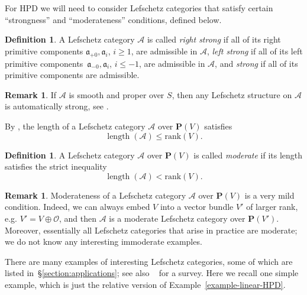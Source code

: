 \documentclass[11pt, reqno]{amsart}
\numberwithin{equation}{section}
\theoremstyle{plain}
\theoremstyle{definition}
\newtheorem{definition}[theorem]{Definition}
\newtheorem{remark}[theorem]{Remark}
\DeclareMathOperator{\length}{\mathrm{length}}
\newcommand{\rank}{\mathrm{rank}}
\newcommand{\cO}{\mathcal{O}}
\newcommand{\cA}{\mathcal{A}}
\newcommand{\fa}{\mathfrak{a}}
\newcommand{\bP}{\mathbf{P}}
\begin{document}
For HPD we will need to consider Lefschetz categories that satisfy 
certain ``strongness'' and ``moderateness'' conditions, defined below. 

\begin{definition}
\label{definition:strong}
A Lefschetz category $\cA$ is called \emph{right strong} if all of its right primitive components 
$\fa_{+0}, \fa_i$, $i \geq 1$, are admissible in $\cA$, 
\emph{left strong} if all of its left primitive components~$\fa_{-0}, \fa_{i}$, $i \leq -1$, are admissible in $\cA$, 
and \emph{strong} if all of its primitive components are admissible. 
\end{definition} 

\begin{remark}
\label{remark:smooth-strong}
If $\cA$ is smooth and proper over $S$, then any Lefschetz structure on $\cA$ is automatically strong, 
see \cite[Remark 6.7]{NCHPD}. 
\end{remark}

By \cite[Corollary 6.19(1)]{NCHPD}, the length of a Lefschetz category $\cA$ over $\bP(V)$ satisfies 
\begin{equation}
\label{length-leq-rank}
\length(\cA) \leq \rank(V). 
\end{equation}

\begin{definition}
\label{def:moderateness}
A Lefschetz category $\cA$ over $\bP(V)$ is called \emph{moderate} if its length satisfies the strict inequality
\begin{equation*}
\length(\cA) < \rank(V) . 
\end{equation*} 
\end{definition}

\begin{remark}
\label{remark-moderate} 
Moderateness of a Lefschetz category $\cA$ over $\bP(V)$ is a very mild condition. 
Indeed, we can always embed $V$ into a vector bundle $V'$ of larger rank, 
e.g. $V' = V \oplus \cO$, and then $\cA$ is a moderate Lefschetz category 
over $\bP(V')$. 
Moreover, essentially all Lefschetz categories that arise in practice are moderate; 
we do not know any interesting immoderate examples. 
\end{remark}

There are many examples of interesting Lefschetz categories, 
some of which are listed in~\S\ref{section:applications}; see also ~\cite{kuznetsov2014semiorthogonal} for a survey. 
Here we recall one simple example, which is just the relative version of Example~\ref{example-linear-HPD}.
\end{document}

